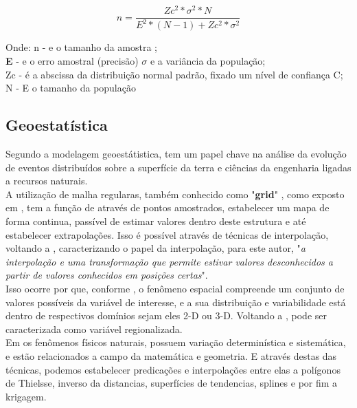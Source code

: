 	\begin{minipage}[t!]{0.30\textwidth}
		\begin{equation}\label{eq:namostra}
			n = \dfrac{ Zc ^{2}*\sigma ^{2} *N  }{ E ^{2} * (N-1) + Zc ^{2} * \sigma ^{2}}
			\end{equation}
		\end{minipage}\hfill
		\begin{minipage}[t!]{0.685\textwidth}
			Onde: 
			n -  e o tamanho da amostra ;\\
			\textbf{E} -  e o erro amostral (precisão)
			$ \sigma $ e a variância da população;\\
			Zc  -  é a abscissa da distribuição normal padrão, fixado um nível de confiança  C;\\
			N  - E o tamanho da população
		\end{minipage} 
		
 
		\subsection{Geoestatística} 
		
		\hspace*{1.25 cm} Segundo \cite[p.1]{delgado}  a modelagem geoestátistica, tem um papel chave na análise da evolução de eventos distribuídos sobre a superfície da terra e ciências da engenharia ligadas a recursos naturais. \\
		\hspace*{1.25 cm} A  utilização de malha regularas, também conhecido como "\textbf{grid}" , como exposto em \cite[p.83]{Andriotti}, tem a função de através de pontos amostrados, estabelecer um mapa de forma continua, passível de estimar valores dentro deste estrutura e até estabelecer extrapolações. Isso é possível através de técnicas de interpolação, voltando a \cite[p.304]{Ariza},  caracterizando o papel da interpolação, para este autor, "\textit{a interpolação e uma transformação que permite estivar valores desconhecidos a partir de valores conhecidos em posições certas}". \\
		\hspace*{1.25 cm} Isso ocorre por que, conforme \cite[p.21]{Yamamoto}, o fenômeno espacial compreende um conjunto de valores possíveis da variável de interesse, e a sua distribuição e variabilidade está dentro de respectivos domínios sejam eles 2-D ou 3-D.  Voltando a  \cite[p.95]{Andriotti}, pode ser caracterizada como variável regionalizada.\\
		\hspace*{1.25 cm}  Em  \cite[p.37]{Webster} os fenômenos físicos naturais, possuem variação determinística e sistemática, e estão relacionados a campo da matemática e geometria. E através destas das técnicas, podemos estabelecer predicações e interpolações entre elas a polígonos de Thielsse, inverso da distancias, superfícies de tendencias, splines e por fim a krigagem.   
